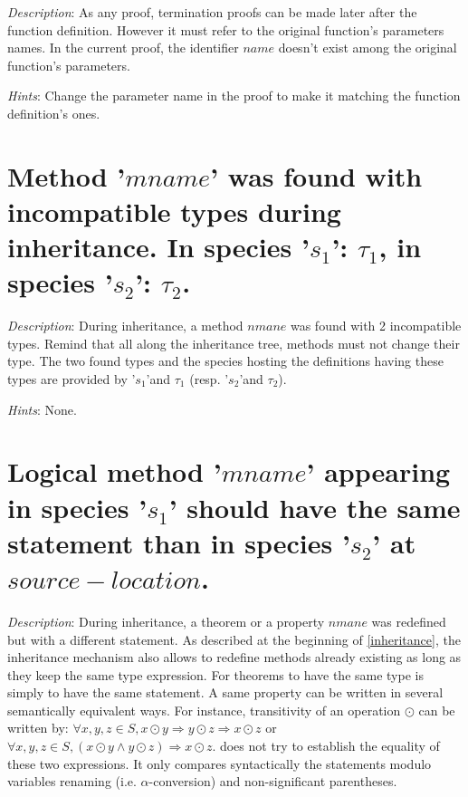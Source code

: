 {\em Description}: As any proof, termination proofs can be made later
after the function definition. However it must refer to the original
function's parameters names. In the current proof, the identifier
$name$ doesn't exist among the original function's parameters.

{\em Hints}: Change the parameter name in the proof to make it
matching the function definition's ones.



\section*{Method '$mname$' was found with incompatible types during
  inheritance. In species '$s_1$': $\tau_1$, in species '$s_2$':
  $\tau_2$.}

{\em Description}: During inheritance, a method $nmane$ was found with
2 incompatible types. Remind that all along the inheritance tree,
methods must not change their type. The two found types and the
species hosting the definitions having these types are provided by
'$s_1$'and $\tau_1$ (resp. '$s_2$'and $\tau_2$).

{\em Hints}: None.



\section*{Logical method '$mname$' appearing in species '$s_1$' should
  have the same statement than in species '$s_2$' at
  $source-location$.}

{\em Description}: During inheritance, a theorem or a property $nmane$
was redefined but with a different statement. As described at the
beginning of \ref{inheritance}, the inheritance mechanism also allows
to redefine methods already existing as long as they keep the same
type expression.  For theorems to have the same type is simply to have
the same statement. A same property can be written in several
semantically equivalent ways. For instance, transitivity of an
operation $\odot$ can be written by:
$\forall x, y, z \in S, x \odot y \Rightarrow y \odot z \Rightarrow
x \odot z$
or
$\forall x, y, z \in S, (x \odot y \wedge y \odot z) \Rightarrow
x \odot z$.
{\focal} does not try to establish the equality of these two
expressions. It only compares syntactically the statements modulo
variables renaming (i.e. $\alpha$-conversion) and non-significant
parentheses.

